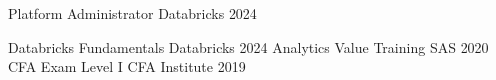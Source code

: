

\begin{cvhonors}

  \cvhonor
    {Platform Administrator} %
    {Databricks} %
    {} %
    {2024} %

  \cvhonor
    {Databricks Fundamentals} %
    {Databricks} %
    {} %
    {2024} %
  \cvhonor
    {Analytics Value Training} %
    {SAS} %
    {} %
    {2020} %
  \cvhonor
    {CFA Exam Level I} %
    {CFA Institute} %
    {} %
    {2019} %

\end{cvhonors}
